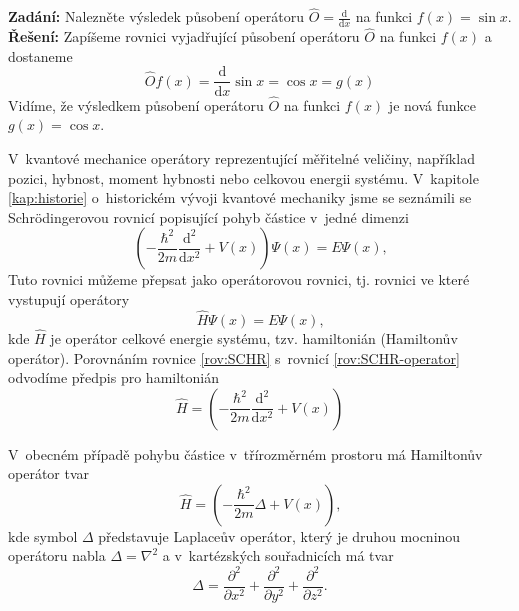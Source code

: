 \begin{priklad} \label{pr:Operator}
\textbf{Zadání:} Nalezněte výsledek působení operátoru $\hat{O}=\frac{\mathrm{d}}{\mathrm{d}x}$ na funkci $f(x) = \sin x$. \\
\textbf{Řešení:} Zapíšeme rovnici vyjadřující působení operátoru $\hat{O}$ na funkci $f(x)$ a dostaneme
\begin{displaymath}
\hat{O} f(x) = \frac{\mathrm{d}}{\mathrm{d}x} \sin x = \cos x = g(x)
\end{displaymath}
Vidíme, že výsledkem působení operátoru $\hat{O}$ na funkci $f(x)$ je nová funkce $g(x) = \cos x$.
\end{priklad}

V~kvantové mechanice operátory reprezentující měřitelné veličiny, například pozici, hybnost, moment hybnosti nebo celkovou energii systému. V~kapitole \ref{kap:historie} o~historickém vývoji kvantové mechaniky jsme se seznámili se Schrödingerovou rovnicí popisující pohyb částice v~jedné dimenzi
\begin{equation}
\left( -\frac{\hbar^2}{2m}\frac{\mathrm{d}^2}{\mathrm{d} x^2} + V(x) \right) \Psi(x) = E \Psi(x) \mbox{,}
\label{rov:SCHR}
\end{equation}
Tuto rovnici můžeme přepsat jako operátorovou rovnici, tj. rovnici ve které vystupují operátory
\begin{equation}
\hat{H}\Psi(x) = E \Psi(x)\mbox{,}
\label{rov:SCHR-operator}
\end{equation}
kde $\hat{H}$ je operátor celkové energie systému, tzv. hamiltonián (Hamiltonův operátor). Porovnáním rovnice \eqref{rov:SCHR} s~rovnicí \eqref{rov:SCHR-operator} odvodíme předpis pro hamiltonián
\begin{equation}
\hat{H} = \left( -\frac{\hbar^2}{2m}\frac{\mathrm{d}^2}{\mathrm{d} x^2} + V(x) \right)
\label{rov:Hamiltonian1D}
\end{equation}

V~obecném případě pohybu částice v~třírozměrném prostoru má Hamiltonův operátor tvar
\begin{equation}
\hat{H} = \left( -\frac{\hbar^2}{2m}\Delta + V(x) \right) \mbox{,}
\label{rov:Hamiltonian3D}
\end{equation}
kde symbol $\Delta$ představuje Laplaceův operátor, který je druhou mocninou operátoru nabla $\Delta = \nabla^2$  a v~kartézských souřadnicích má tvar
\begin{equation}
\Delta = \frac{\partial^2}{\partial x^2}+\frac{\partial^2}{\partial y^2}+\frac{\partial^2}{\partial z^2} \mbox{.}
\label{rov:LaplaceuvOperator}
\end{equation}

